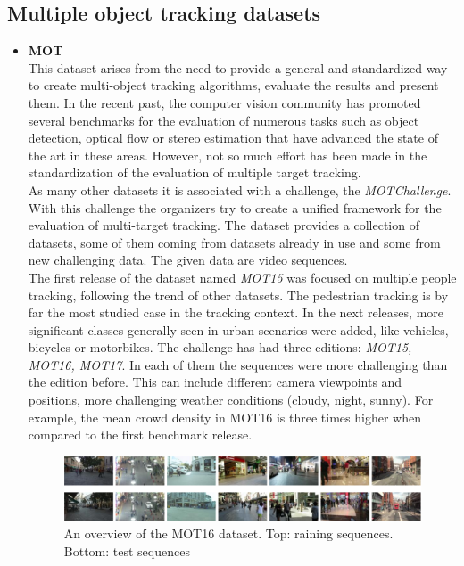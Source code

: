 \subsection{Multiple object tracking datasets}
\begin{itemize}
\item \textbf{MOT} ~\cite{milan2016mot16}\\
This dataset arises from the need to provide a general and standardized way to create multi-object tracking algorithms, evaluate the results and present them. In the recent past, the computer vision community has promoted several benchmarks for the evaluation of numerous tasks such as object detection, optical flow or stereo estimation that have advanced the state of the art in these areas. However, not so much effort has been made in the standardization of the evaluation of multiple target tracking.\\
As many other datasets it is associated with a challenge, the \textit{MOTChallenge}. With this challenge the organizers try to create a unified framework for the evaluation of multi-target tracking. The dataset provides a collection of datasets, some of them coming from datasets already in use and some from new challenging data. The given data are video sequences.\\
The first release of the dataset named \textit{MOT15} was focused on multiple people tracking, following the trend of other datasets. The pedestrian tracking is by far the most studied case in the tracking context. In the next releases, more significant classes generally seen in urban scenarios were added, like vehicles, bicycles or motorbikes. The challenge has had three editions: \textit{MOT15, MOT16, MOT17}. In each of them the sequences were more challenging than the edition before. This can include different camera viewpoints and positions, more challenging weather conditions (cloudy, night, sunny). For example, the mean crowd density in MOT16 is three times higher when compared to the first benchmark release.
\begin{figure}[H]
\begin{center}
\includegraphics[scale=0.4]{previous_version/mot16.png}
\caption{An overview of the MOT16 dataset. Top: raining sequences. Bottom: test sequences ~\cite{milan2016mot16}}

\end{center}
\end{figure}
\end{itemize}
